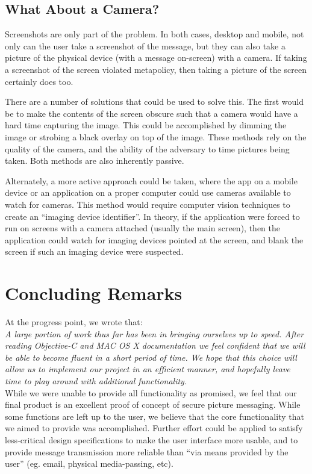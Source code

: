 \documentclass[11pt, a4paper,titlepage]{report}
\begin{document}
\subsection*{What About a Camera?}

Screenshots are only part of the problem. In both cases, desktop and mobile, not only can the user take a screenshot of the message, but they can also take a picture of the physical device (with a message on-screen) with a camera. If taking a screenshot of the screen violated metapolicy, then taking a picture of the screen certainly does too. 

There are a number of solutions that could be used to solve this. The first would be to make the contents of the screen obscure such that a camera would have a hard time capturing the image. This could be accomplished by dimming the image or strobing a black overlay on top of the image. These methods rely on the quality of the camera, and the ability of the adversary to time pictures being taken. Both methods are also inherently passive.

Alternately, a more active approach could be taken, where the app on a mobile device or an application on a proper computer could use cameras available to watch for cameras. This method would require computer vision techniques to create an ``imaging device identifier''. In theory, if the application were forced to run on screens with a camera attached (usually the main screen), then the application could watch for imaging devices pointed at the screen, and blank the screen if such an imaging device were suspected. 

\section{Concluding Remarks}
At the progress point, we wrote that:\\

\noindent\emph{A large portion of work thus far has been in bringing ourselves up to speed. After reading Objective-C and MAC OS X documentation we feel confident that we will be able to become fluent in a short period of time. We hope that this choice will allow us to implement our project in an efficient manner, and hopefully leave time to play around with additional functionality.}\\

While we were unable to provide all functionality as promised, we feel that our final product is an excellent proof of concept of secure picture messaging. While some functions are left up to the user, we believe that the core functionality that we aimed to provide was accomplished. Further effort could be applied to satisfy less-critical design specifications to make the user interface more usable, and to provide message transmission more reliable than ``via means provided by the user'' (eg. email, physical media-passing, etc). 
\end{document}
